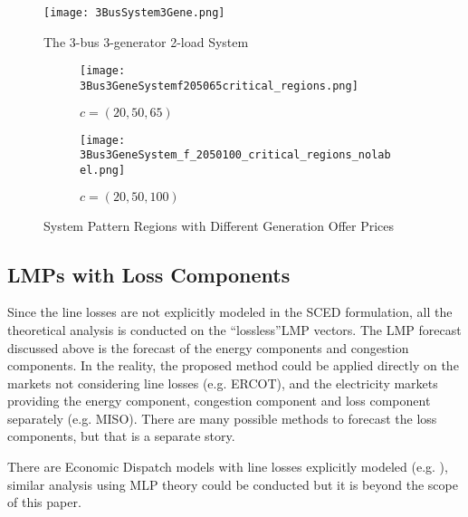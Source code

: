 \documentclass[letterpaper, 11pt]{article}
\theoremstyle{plain}
\theoremstyle{definition}
\begin{document}
\begin{figure}[htbp]
  \centering
  \texttt{[image: 3BusSystem3Gene.png]}
  \caption{The 3-bus 3-generator 2-load System}
  \label{fig:3BusSystem3Gene}
\end{figure}

\begin{figure}[htbp]
  \centering
  \begin{subfigure}[t]{0.49\linewidth}
  \centering
  \texttt{[image: 3Bus3GeneSystemf205065critical\_regions.png]}
  \caption{$c = (20,50,65)$}
  \label{fig:c_205065}
  \end{subfigure}
  \begin{subfigure}[t]{0.49\linewidth}
  \centering
  \texttt{[image: 3Bus3GeneSystem\_f\_2050100\_critical\_regions\_nolabel.png]}
  \caption{$c = (20,50,100)$}
  \label{fig:c_2050100}
  \end{subfigure}
  \caption{System Pattern Regions with Different Generation Offer Prices}
  \label{fig:SPRs_with_diff_offer_price}
\end{figure}



\subsection{LMPs with Loss Components} \label{sub:lmps_with_loss_components}
Since the line losses are not explicitly modeled in the SCED formulation, all the theoretical analysis is conducted on the ``lossless''LMP vectors. The LMP forecast discussed above is the forecast of the energy components and congestion components. In the reality, the proposed method could be applied directly on the markets not considering line losses (e.g. ERCOT), and the electricity markets providing the energy component, congestion component and loss component separately (e.g. MISO). There are many possible methods to forecast the loss components, but that is a separate story.

There are Economic Dispatch models with line losses explicitly modeled (e.g. \cite{Litvinov2004}), similar analysis using MLP theory could be conducted but it is beyond the scope of this paper.
\end{document}
